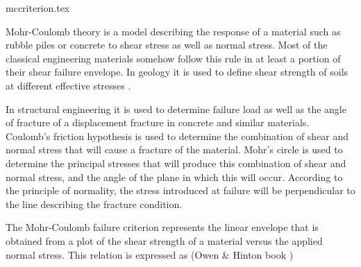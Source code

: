 \begin{flushright} {\tiny {\color{gray} mccriterion.tex}} \end{flushright}

Mohr-Coulomb theory is a model describing the response of a material such as rubble piles or concrete to shear stress as well as normal stress. 
Most of the classical engineering materials somehow follow this rule in at least a portion of their shear failure envelope. In geology it is used to define shear strength of soils at different effective stresses \cite{hand69}.

In structural engineering it is used to determine failure load as well as the angle of fracture of a displacement fracture in concrete and similar materials. Coulomb's friction hypothesis is used to determine the combination of shear and normal stress that will cause a fracture of the material. Mohr's circle is used to determine the principal stresses that will produce this combination of shear and normal stress, and the angle of the plane in which this will occur. According to the principle of normality, the stress introduced at failure will be perpendicular to the line describing the fracture condition.


The Mohr-Coulomb failure criterion represents the linear envelope that is obtained from a plot of the shear strength of a material 
versus the applied normal stress. This relation is expressed as (Owen \& Hinton book \cite[p219]{owhi})



